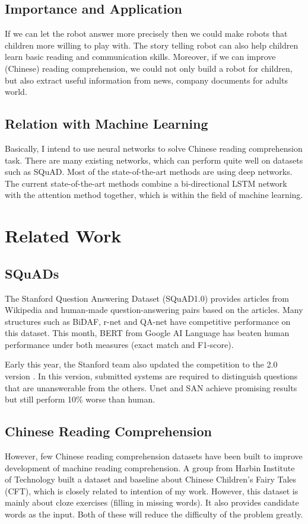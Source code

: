 \documentclass{article}
\begin{document}
\subsection{Importance and Application}
If we can let the robot answer more precisely then we could make robots that children more willing to play with. The story telling robot can also help children learn basic reading and communication skills. Moreover, if we can improve (Chinese) reading comprehension, we could not only build a robot for children, but also extract useful information from news, company documents for adults world.
\subsection{Relation with Machine Learning}
Basically, I intend to use neural networks to solve Chinese reading comprehension task. There are many existing networks, which can perform quite well on datasets such as SQuAD. Most of the state-of-the-art methods are using deep networks. The current state-of-the-art methods combine a bi-directional LSTM network with the attention method together, which is within the field of machine learning.

\section{Related Work}
\subsection{SQuADs}
The Stanford Question Answering Dataset (SQuAD1.0)\cite{SQuAD1.0} provides articles from Wikipedia and human-made question-answering pairs based on the articles. Many structures such as BiDAF\cite{BiDAF}, r-net\cite{r-net} and QA-net\cite{QA-net} have competitive performance on this dataset. This month, BERT from Google AI Language\cite{BERT} has beaten human performance under both measures (exact match and F1-score).

Early this year, the Stanford team also updated the competition to the 2.0 version \cite{SQuAD2.0}. In this version, submitted systems are required to distinguish questions that are unanswerable from the others. Unet\cite{Unet} and SAN\cite{SAN} achieve promising results but still perform 10\% worse than human.
\subsection{Chinese Reading Comprehension}
However, few Chinese reading comprehension datasets have been built to improve development of machine reading comprehension. A group from Harbin Institute of Technology built a dataset and baseline about Chinese Children's Fairy Tales (CFT)\cite{CFT}, which is closely related to intention of my work. However, this dataset is mainly about cloze exercises (filling in missing words). It also provides candidate words as the input. Both of these will reduce the difficulty of the problem greatly.
\end{document}
